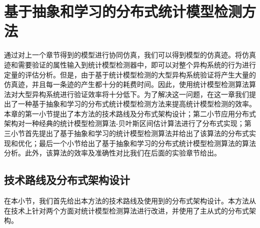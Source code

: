 \chapter{基于抽象和学习的分布式统计模型检测方法}
\label{ch4}
通过对上一个章节得到的模型进行协同仿真，我们可以得到模型的仿真迹。将仿真迹和需要验证的属性输入到统计模型检测器中，即可以对整个异构系统的行为进行定量的评估分析。但是，由于基于统计模型检测的大型异构系统验证将产生大量的仿真迹，并且每一条迹的产生都十分的耗费时间。因此，使用统计模型检测算法算法对大型异构系统进行验证效率将十分低下。为了解决这一问题，在这一章我们提出了一种基于抽象和学习的分布式统计模型检测方法来提高统计模型检测的效率。本章的第一小节提出了本方法的技术路线及分布式架构设计；第二小节应用分布式架构对一种经典的统计模型检测算法-贝叶斯区间估计算法\cite{zuliani2013bayesian}进行了分布式实现；第三小节首先提出了基于抽象和学习的统计模型检测算法并给出了该算法的分布式实现和优化；最后一个小节给出了基于抽象和学习的分布式统计模型检测算法的算法分析。此外，该算法的效率及准确性对比我们在后面的实验章节给出。
\section{技术路线及分布式架构设计}
在本小节，我们首先给出本方法的技术路线及使用到的分布式架构设计。本方法从在技术上针对两个方面对统计模型检测算法进行改进，并使用了主从式的分布式架构。
